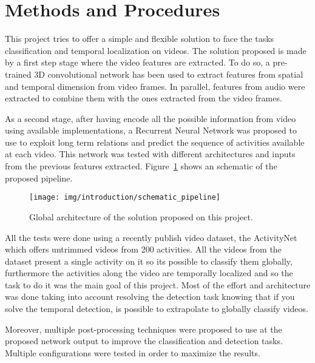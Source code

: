 
\section{Methods and Procedures}

This project tries to offer a simple and flexible solution to face the tasks classification and temporal localization on videos. The solution proposed is made by a first step stage where the video features are extracted. To do so, a pre-trained 3D convolutional network has been used to extract features from spatial and temporal dimension from video frames. In parallel, features from audio were extracted to combine them with the ones extracted from the video frames.

As a second stage, after having encode all the possible information from video using available implementations, a Recurrent Neural Network was proposed to use to exploit long term relations and predict the sequence of activities available at each video. This network was tested with different architectures and inputs from the previous features extracted. Figure~\ref{fig:global_pipeline} shows an schematic of the proposed pipeline.

\begin{figure}[ht]
\begin{center}
\texttt{[image: img/introduction/schematic\_pipeline]}
\end{center}
\caption{Global architecture of the solution proposed on this project.}
\label{fig:global_pipeline}
\end{figure}

All the tests were done using a recently publish video dataset, the ActivityNet which offers untrimmed videos from 200 activities. All the videos from the dataset present a single activity on it so its possible to classify them globally, furthermore the activities along the video are temporally localized and so the task to do it was the main goal of this project. Most of the effort and architecture was done taking into account resolving the detection task knowing that if you solve the temporal detection, is possible to extrapolate to globally classify videos. 

Moreover, multiple post-processing techniques were proposed to use at the proposed network output to improve the classification and detection tasks. Multiple configurations were tested in order to maximize the results.

